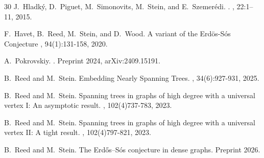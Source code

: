 \documentclass[12pt]{article}
\begin{document}
\begin{thebibliography}{30}
J.~Hladk{\'y}, D.~Piguet, M.~Simonovits, M.~Stein, and E.~Szemer{\'e}di.
.
, 22:1--11, 2015.
\fi



F.~Havet,  B.~Reed, M.~Stein, and D.~Wood.
\newblock A variant of the Erd{\"o}s-S{\'o}s Conjecture
, 94(1):131-158, 2020. 

A.~Pokrovskiy.
.
\newblock Preprint 2024, arXiv:2409.15191.


B.~Reed and M.~Stein.
\newblock Embedding Nearly Spanning Trees.
,  34(6):927-931, 2025.


B.~Reed and M.~Stein.
\newblock Spanning trees in graphs of high degree with a universal vertex {I}: An asymptotic result.
, 102(4)737-783, 2023.


B.~Reed and M.~Stein.
\newblock Spanning trees in graphs of high degree with a universal vertex {II}: A tight result.
, 102(4)797-821, 2023.

B.~Reed and M.~Stein.
\newblock The {E}rd{\H{o}}s--{S}\'os conjecture in dense graphs.
\newblock Preprint 2026.

\end{thebibliography}
\end{document}
